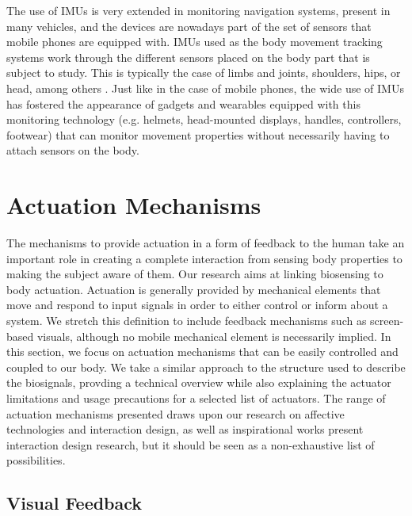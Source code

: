 
The use of IMUs is very extended in monitoring navigation systems, present in many vehicles, and the devices are nowadays part of the set of sensors that mobile phones are equipped with. IMUs used as the body movement tracking systems work through the different sensors placed on the body part that is subject to study. This is typically the case of limbs and joints, shoulders, hips, or head, among others \cite{niswander_optimization_2020}. Just like in the case of mobile phones, the wide use of IMUs has fostered the appearance of gadgets and wearables equipped with this monitoring technology (e.g. helmets, head-mounted displays, handles, controllers, footwear) that can monitor movement properties without necessarily having to attach sensors on the body.

\section{Actuation Mechanisms}

The mechanisms to provide actuation in a form of feedback to the human take an important role in creating a complete interaction from sensing body properties to making the subject aware of them. Our research aims at linking biosensing to body actuation. Actuation is generally provided by mechanical elements that move and respond to input signals in order to either control or inform about a system. We stretch this definition to include feedback mechanisms such as screen-based visuals, although no mobile mechanical element is necessarily implied. In this section, we focus on actuation mechanisms that can be easily controlled and coupled to our body. We take a similar approach to the structure used to describe the biosignals, provding a technical overview while also explaining the actuator limitations and usage precautions for a selected list of actuators. The range of actuation mechanisms presented draws upon our research on affective technologies and interaction design, as well as inspirational works present interaction design research, but it should be seen as a non-exhaustive list of possibilities.

\subsection*{Visual Feedback}

